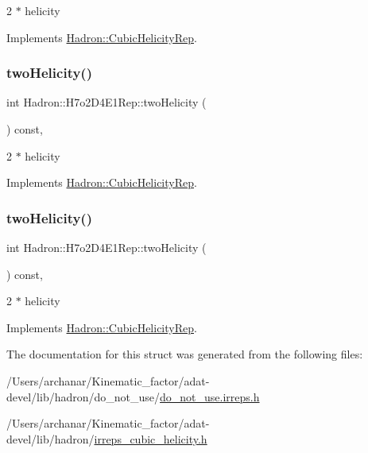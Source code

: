 2 $\ast$ helicity 

Implements \mbox{\hyperlink{structHadron_1_1CubicHelicityRep_af507aa56fc2747eacc8cb6c96db31ecc}{Hadron\+::\+Cubic\+Helicity\+Rep}}.

\mbox{\label{structHadron_1_1H7o2D4E1Rep_a66f98547f6f9ab434d2b836bc46deddc}} 
\subsubsection{\texorpdfstring{twoHelicity()}{twoHelicity()}\hspace{0.1cm}{\footnotesize\ttfamily [2/3]}}
{\footnotesize\ttfamily int Hadron\+::\+H7o2\+D4\+E1\+Rep\+::two\+Helicity (\begin{DoxyParamCaption}{ }\end{DoxyParamCaption}) const\hspace{0.3cm}{\ttfamily [inline]}, {\ttfamily [virtual]}}

2 $\ast$ helicity 

Implements \mbox{\hyperlink{structHadron_1_1CubicHelicityRep_af507aa56fc2747eacc8cb6c96db31ecc}{Hadron\+::\+Cubic\+Helicity\+Rep}}.

\mbox{\label{structHadron_1_1H7o2D4E1Rep_a66f98547f6f9ab434d2b836bc46deddc}} 
\subsubsection{\texorpdfstring{twoHelicity()}{twoHelicity()}\hspace{0.1cm}{\footnotesize\ttfamily [3/3]}}
{\footnotesize\ttfamily int Hadron\+::\+H7o2\+D4\+E1\+Rep\+::two\+Helicity (\begin{DoxyParamCaption}{ }\end{DoxyParamCaption}) const\hspace{0.3cm}{\ttfamily [inline]}, {\ttfamily [virtual]}}

2 $\ast$ helicity 

Implements \mbox{\hyperlink{structHadron_1_1CubicHelicityRep_af507aa56fc2747eacc8cb6c96db31ecc}{Hadron\+::\+Cubic\+Helicity\+Rep}}.



The documentation for this struct was generated from the following files\+:\begin{DoxyCompactItemize}
\item 
/\+Users/archanar/\+Kinematic\+\_\+factor/adat-\/devel/lib/hadron/do\+\_\+not\+\_\+use/\mbox{\hyperlink{adat-devel_2lib_2hadron_2do__not__use_2do__not__use_8irreps_8h}{do\+\_\+not\+\_\+use.\+irreps.\+h}}\item 
/\+Users/archanar/\+Kinematic\+\_\+factor/adat-\/devel/lib/hadron/\mbox{\hyperlink{adat-devel_2lib_2hadron_2irreps__cubic__helicity_8h}{irreps\+\_\+cubic\+\_\+helicity.\+h}}\end{DoxyCompactItemize}
